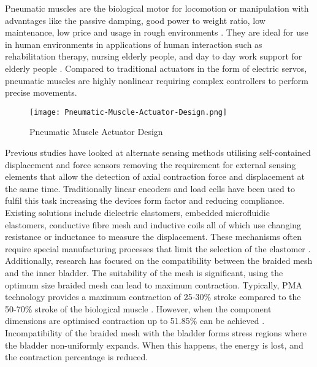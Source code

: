 \documentclass[11pt,a4paper]{article}
\begin{document}
Pneumatic muscles are the biological motor for locomotion or manipulation with advantages like the passive damping, good power to weight ratio, low maintenance, low price and usage in rough environments \cite{ranjan_upadhyay_kumar_dhyani_2012}. They are ideal for use in human environments in applications of human interaction such as rehabilitation therapy, nursing elderly people, and day to day work support for elderly people \cite{saga_nagase_saikawa_2006}. Compared to traditional actuators in the form of electric servos, pneumatic muscles are highly nonlinear requiring complex controllers to perform precise movements. \newline

\begin{figure}[ht!]
    \centering
    \texttt{[image: Pneumatic-Muscle-Actuator-Design.png]}
    \caption{Pneumatic Muscle Actuator Design \cite{pneumatic_image}}
    \label{fig:pneumatic_design}
\end{figure}

Previous studies have looked at alternate sensing methods utilising self-contained displacement and force sensors removing the requirement for external sensing elements that allow the detection of axial contraction force and displacement at the same time. Traditionally linear encoders and load cells have been used to fulfil this task increasing the devices form factor and reducing compliance. Existing solutions include dielectric elastomers, embedded microfluidic elastomers, conductive fibre mesh and inductive coils all of which use changing resistance or inductance to measure the displacement. These mechanisms often require special manufacturing processes that limit the selection of the elastomer \cite{erin_pol_valle_park_2016}. 
Additionally, research has focused on the compatibility between the braided mesh and the inner bladder. The suitability of the mesh is significant, using the optimum size braided mesh can lead to maximum contraction. Typically, PMA technology provides a maximum contraction of 25-30\% stroke compared to the 50-70\% stroke of the biological muscle \cite{andrikopoulos_nikolakopoulos_2017}. However, when the component dimensions are optimised contraction up to 51.85\% can be achieved \cite{najmuddin_mustaffa_2017}. Incompatibility of the braided mesh with the bladder forms stress regions where the bladder non-uniformly expands. When this happens, the energy is lost, and the contraction percentage is reduced. \newline
\end{document}
